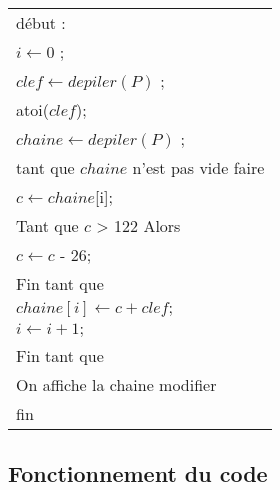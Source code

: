 \documentclass[a4paper, 12pt]{article}
\begin{document}
\begin{center}
  \begin{tabularx}{\textwidth}{|X|}
    \hline
    début : \\
    \hspace{1em}$i \leftarrow 0$ ; \\
    \hspace{1em}$clef \leftarrow depiler(P)$ ; \\
    \hspace{1em}atoi($clef$); \\ 
    \hspace{1em}$chaine \leftarrow depiler(P)$ ; \\
    \hspace{1em}tant que $chaine$ n'est pas vide faire \\
    \hspace{2em}$c \leftarrow chaine$[i]; \\
    \hspace{2em}Tant que $c$ > 122  Alors \\
    \hspace{3em}$c \leftarrow c$ - 26;\\
    \hspace{2em}Fin tant que \\
    \hspace{2em}$chaine[i] \leftarrow c + clef;$ \\
    \hspace{2em}$i \leftarrow i + 1;$ \\
    \hspace{1em}Fin tant que \\
    \hspace{1em}On affiche la chaine modifier \\
    fin \\
    \hline
  \end{tabularx}
\end{center}


\subsection{Fonctionnement du code}
\end{document}
